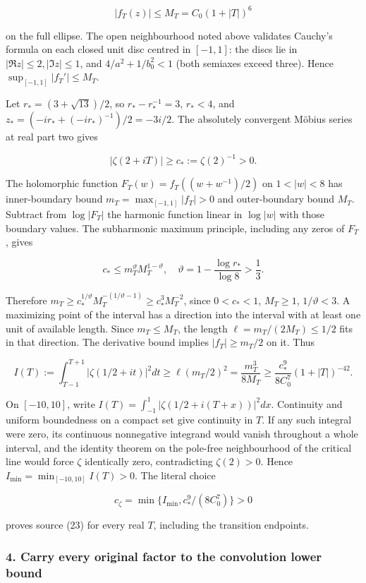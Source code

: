 \[
|f_T(z)|\le M_T=C_0(1+|T|)^6
\]

on the full ellipse. The open neighbourhood noted above validates Cauchy's formula on each closed unit disc centred in \([-1,1]\): the discs lie in \(|\Re z|\le2, |\Im z|\le1\), and \(4/a^2+1/b_0^2<1\) (both semiaxes exceed three). Hence \(\sup_{[-1,1]}|f_T'|\le M_T\).

Let \(r_*=(3+\sqrt{13})/2\), so \(r_*-r_*^{-1}=3\), \(r_*<4\), and \(z_*=(-ir_*+(-ir_*)^{-1})/2=-3i/2\). The absolutely convergent Möbius series at real part two gives

\[
|\zeta(2+iT)|\ge c_*:=\zeta(2)^{-1}>0.
\]

The holomorphic function \(F_T(w)=f_T((w+w^{-1})/2)\) on \(1<|w|<8\) has inner-boundary bound \(m_T=\max_{[-1,1]}|f_T|>0\) and outer-boundary bound \(M_T\). Subtract from \(\log|F_T|\) the harmonic function linear in \(\log|w|\) with those boundary values. The subharmonic maximum principle, including any zeros of \(F_T\), gives

\[
c_*\le m_T^\vartheta M_T^{1-\vartheta},\quad
\vartheta=1-\frac{\log r_*}{\log8}>\frac13.
\]

Therefore \(m_T\ge c_*^{1/\vartheta}M_T^{-(1/\vartheta-1)}\ge c_*^3M_T^{-2}\), since \(0<c_*<1\), \(M_T\ge1\), \(1/\vartheta<3\). A maximizing point of the interval has a direction into the interval with at least one unit of available length. Since \(m_T\le M_T\), the length \(\ell=m_T/(2M_T)\le1/2\) fits in that direction. The derivative bound implies \(|f_T|\ge m_T/2\) on it. Thus

\[
I(T):=\int_{T-1}^{T+1}|\zeta(1/2+it)|^2dt
\ge\ell(m_T/2)^2
=\frac{m_T^3}{8M_T}
\ge\frac{c_*^9}{8C_0^7}(1+|T|)^{-42}.
\]

On \([-10,10]\), write \(I(T)=\int_{-1}^1|\zeta(1/2+i(T+x))|^2dx\). Continuity and uniform boundedness on a compact set give continuity in \(T\). If any such integral were zero, its continuous nonnegative integrand would vanish throughout a whole interval, and the identity theorem on the pole-free neighbourhood of the critical line would force \(\zeta\) identically zero, contradicting \(\zeta(2)>0\). Hence \(I_{\min}=\min_{[-10,10]}I(T)>0\). The literal choice

\[
c_\zeta=\min\{I_{\min},c_*^9/(8C_0^7)\}>0
\]

proves source (23) for every real \(T\), including the transition endpoints.

\subsubsection{4. Carry every original factor to the convolution lower bound}\label{endpoint-arithmetic_intake--carry-every-original-factor-to-the-convolution-lower-bound}

